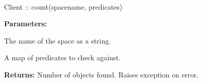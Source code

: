 \paragraph{}
\label{api:java:count}
\begin{javacode}
Client :: count(spacename, predicates)
\end{javacode}
\funcdesc 

\noindent\textbf{Parameters:}
\begin{description}[labelindent=\widthof{{\code{predicates}}},leftmargin=*,noitemsep,nolistsep,align=right]
\item[\code{spacename}] The name of the space as a string.
\item[\code{predicates}] A map of predicates to check against.
\end{description}

\noindent\textbf{Returns:}
Number of objects found.  Raises exception on error.
